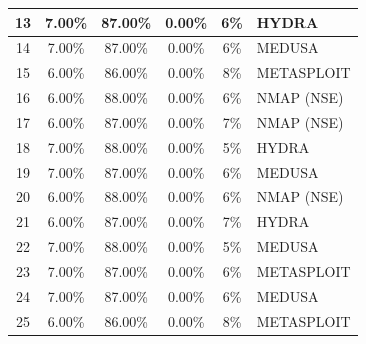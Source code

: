 \begin{table}[H]
\begin{tabular}{|c|c|c|c|c|l|}
		13        & 7.00\%   & 87.00\%     & 0.00\% & 6\%    & HYDRA      \\ \hline
		14        & 7.00\%   & 87.00\%     & 0.00\% & 6\%    & MEDUSA     \\ \hline
		15        & 6.00\%   & 86.00\%     & 0.00\% & 8\%    & METASPLOIT \\ \hline
		16        & 6.00\%   & 88.00\%     & 0.00\% & 6\%    & NMAP (NSE) \\ \hline
		17        & 6.00\%   & 87.00\%     & 0.00\% & 7\%    & NMAP (NSE) \\ \hline
		18        & 7.00\%   & 88.00\%     & 0.00\% & 5\%    & HYDRA      \\ \hline
		19        & 7.00\%   & 87.00\%     & 0.00\% & 6\%    & MEDUSA     \\ \hline
		20        & 6.00\%   & 88.00\%     & 0.00\% & 6\%    & NMAP (NSE) \\ \hline
		21        & 6.00\%   & 87.00\%     & 0.00\% & 7\%    & HYDRA      \\ \hline
		22        & 7.00\%   & 88.00\%     & 0.00\% & 5\%    & MEDUSA     \\ \hline
		23        & 7.00\%   & 87.00\%     & 0.00\% & 6\%    & METASPLOIT \\ \hline
		24        & 7.00\%   & 87.00\%     & 0.00\% & 6\%    & MEDUSA     \\ \hline
		25        & 6.00\%   & 86.00\%     & 0.00\% & 8\%    & METASPLOIT \\ \hline
	\end{tabular}
\end{table}
		
